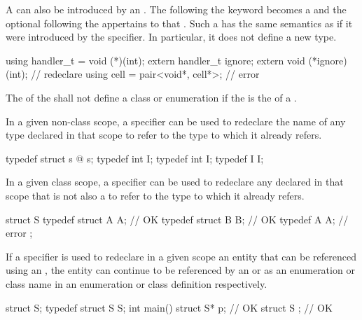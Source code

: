 \pnum
A  can also be introduced by an
. The  following the
 keyword becomes a 
and the optional  following the
 appertains to that .
Such a  has the same
semantics as if it were introduced by the  specifier. In
particular, it does not define a new type.
\begin{example}
\begin{codeblock}
using handler_t = void (*)(int);
extern handler_t ignore;
extern void (*ignore)(int);         // redeclare 
using cell = pair<void*, cell*>;    // error
\end{codeblock}
\end{example}
The 
of the  shall not define
a class or enumeration if the 
is the  of a .

\pnum
{}%
In a given non-class scope, a  specifier can be used to
redeclare the name of any type declared in that scope to refer to the
type to which it already refers.
\begin{example}
\begin{codeblock}
typedef struct s { @\commentellip@ } s;
typedef int I;
typedef int I;
typedef I I;
\end{codeblock}
\end{example}

\pnum
In a given class scope, a  specifier can be used to
redeclare any  declared in that scope that is not
also a  to refer to the type to which it already
refers.
\begin{example}
\begin{codeblock}
struct S {
  typedef struct A { } A;       // OK
  typedef struct B B;           // OK
  typedef A A;                  // error
};
\end{codeblock}
\end{example}

\pnum
If a  specifier is used to redeclare in a given scope an
entity that can be referenced using an ,
the entity can continue to be referenced by an
 or as an enumeration or class name
in an enumeration or class definition respectively.
\begin{example}
\begin{codeblock}
struct S;
typedef struct S S;
int main() {
  struct S* p;                  // OK
}
struct S { };                   // OK
\end{codeblock}
\end{example}

